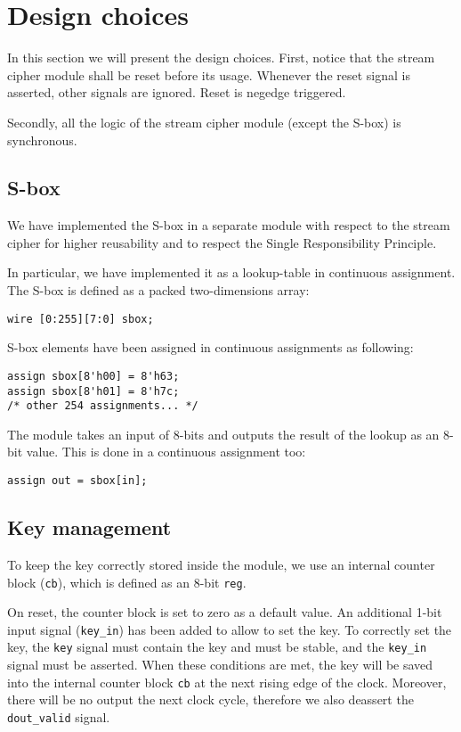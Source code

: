 \section{Design choices}
In this section we will present the design choices. First, notice that the stream cipher module shall be reset before its usage. Whenever the reset signal is asserted, other signals are ignored. Reset is negedge triggered.

Secondly, all the logic of the stream cipher module (except the S-box) is synchronous.

\subsection{S-box}
We have implemented the S-box in a separate module with respect to the stream cipher for higher reusability and to respect the Single Responsibility Principle.

In particular, we have implemented it as a lookup-table in continuous assignment. The S-box is defined as a packed two-dimensions array:
\begin{lstlisting}
wire [0:255][7:0] sbox;
\end{lstlisting}
S-box elements have been assigned in continuous assignments as following:
\begin{lstlisting}
assign sbox[8'h00] = 8'h63;
assign sbox[8'h01] = 8'h7c;
/* other 254 assignments... */
\end{lstlisting}
The module takes an input of 8-bits and outputs the result of the lookup as an 8-bit value. This is done in a continuous assignment too:
\begin{lstlisting}
assign out = sbox[in];
\end{lstlisting}

\subsection{Key management}

To keep the key correctly stored inside the module, we use an internal counter block (\lstinline{cb}), which is defined as an 8-bit \lstinline{reg}.

On reset, the counter block is set to zero as a default value. An additional 1-bit input signal (\lstinline{key_in}) has been added to allow to set the key. To correctly set the key, the \lstinline{key} signal must contain the key and must be stable, and the \lstinline{key_in} signal must be asserted. When these conditions are met, the key will be saved into the internal counter block \lstinline{cb} at the next rising edge of the clock. Moreover, there will be no output the next clock cycle, therefore we also deassert the \lstinline{dout_valid} signal.


